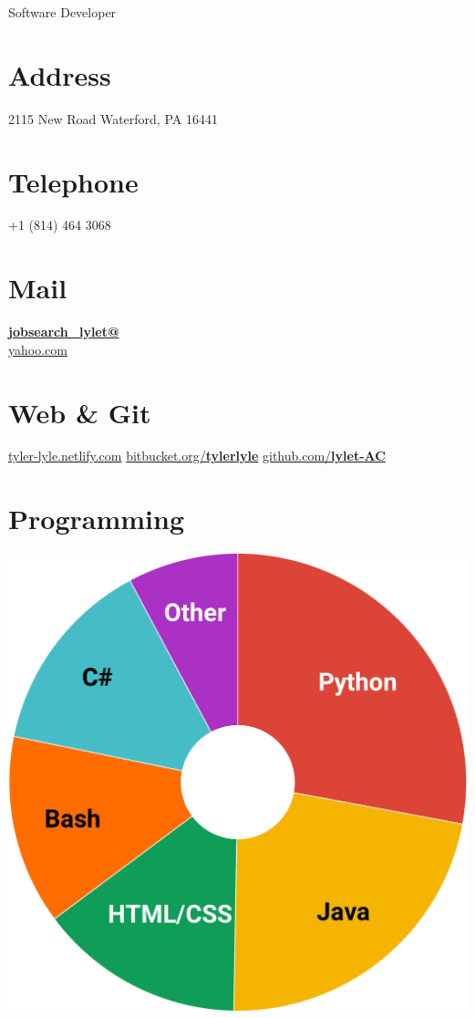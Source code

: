 \documentclass[]{friggeri-cv}
\begin{document}
      {Software Developer}
      

\begin{aside}
  \section{Address}
    2115 New Road
    Waterford, PA 16441
    ~
  \section{Telephone}
    +1 (814) 464 3068
    ~
  \section{Mail}
    \href{mailto:}{\textbf{jobsearch\_lylet@}\\yahoo.com}
    ~
  \section{Web \& Git}
    \href{https://tyler-lyle.netlify.com/}{tyler-lyle.netlify.com}
    \href{https://bitbucket.org/tylerlyle}{bitbucket.org/\textbf{tylerlyle}}
    \href{https://github.com/lylet-AC}{github.com/\textbf{lylet-AC}}
    ~
  \section{Programming}
    \includegraphics[scale=0.18]{img/pvl.pdf}
    ~

\end{aside}
\end{document}
